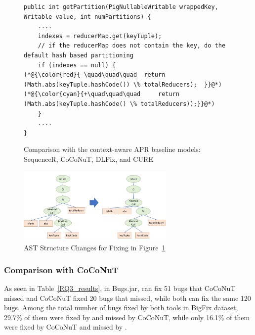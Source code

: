 \begin{figure}[t]
	\centering
	\begin{lstlisting}[]
public int getPartition(PigNullableWritable wrappedKey, Writable value, int numPartitions) {
	....
	indexes = reducerMap.get(keyTuple);
	// if the reducerMap does not contain the key, do the default hash based partitioning
	if (indexes == null) {
(*@{\color{red}{-\quad\quad\quad  return (Math.abs(keyTuple.hashCode()) \% totalReducers);	}}@*)
(*@{\color{cyan}{+\quad\quad\quad     return (Math.abs(keyTuple.hashCode() \% totalReducers));}}@*)
	}
	....
}
	\end{lstlisting}
        \vspace{-12pt}
	\caption{Comparison with the context-aware APR baseline models: SequenceR, CoCoNuT, DLFix, and CURE}
	\label{example_3}
\end{figure}


\begin{figure}[t]
	\centering
	\includegraphics[width=3in]{graphs/example_3.png}
        \vspace{-6pt}
	\caption{AST Structure Changes for Fixing in Figure~\ref{example_3}}
	\label{tree-change}
\end{figure}


\subsubsection{\bf Comparison with CoCoNuT}

As seen in Table~\ref{RQ3_results}, in Bugs.jar, {\tool} can fix 51
bugs that CoCoNuT missed and CoCoNuT fixed 20 bugs that {\tool}
missed, while both can fix the same 120 bugs. Among the total
number of bugs fixed by both tools in BigFix dataset, 29.7\% of them
were fixed by {\tool} and missed by CoCoNuT, while only 16.1\% of them
were fixed by CoCoNuT and missed by {\tool}.

